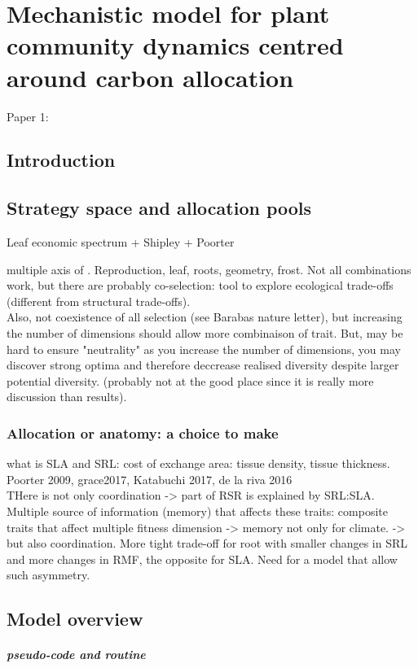 

\chapter{Mechanistic model for plant community dynamics centred around carbon allocation}
Paper 1:
\section{Introduction}
\section{Strategy space and allocation pools}
Leaf economic spectrum + Shipley + Poorter

\The multiple axis of \model. Reproduction, leaf, roots, geometry, frost. Not all combinations work, but there are probably co-selection: tool to explore ecological trade-offs (different from structural trade-offs).\\
Also, not coexistence of all selection (see Barabas nature letter), but increasing the number of dimensions should allow more combinaison of trait. But, may be hard to ensure "neutrality" as you increase the number of dimensions, you may discover strong optima and therefore deccrease realised diversity despite larger potential diversity. (probably not at the good place since it is really more discussion than results).

\subsection{Allocation or anatomy: a choice to make}
what is SLA and SRL: cost of exchange area: tissue density, tissue thickness. Poorter 2009, grace2017, Katabuchi 2017, de la riva 2016\\
THere is not only coordination -> part of RSR is explained by SRL:SLA\cite{freschet_explaining_2015}. Multiple source of information (memory) that affects these traits: composite traits that affect multiple fitness dimension -> memory not only for climate. -> but also coordination. More tight trade-off for root with smaller changes in SRL and more changes in RMF, the opposite for SLA. Need for a model that allow such asymmetry. 
\cite{freschet_integrated_2015}


\section{Model overview}
\paragraph{pseudo-code and routine}
